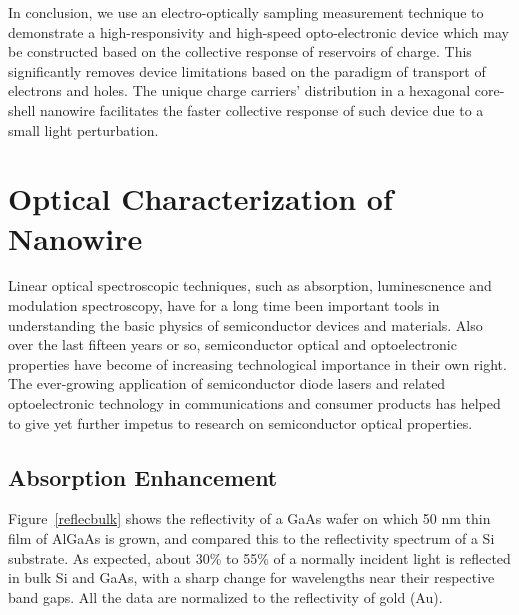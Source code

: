 In conclusion, we use an electro-optically sampling measurement
technique to demonstrate a high-responsivity and high-speed
opto-electronic device which may be constructed based on the collective
response of reservoirs of charge. This significantly removes device
limitations based on the paradigm of transport of electrons and holes.
The unique charge carriers' distribution in a hexagonal core-shell
nanowire facilitates the faster collective response of such device due
to a small light perturbation.

\section{Optical Characterization of Nanowire}

Linear optical spectroscopic
techniques, such as absorption, luminescnence and modulation spectroscopy, have
for a long time been important tools in understanding the basic physics of
semiconductor devices and materials. Also over the last fifteen years or so, semiconductor
optical and optoelectronic properties have become of increasing technological
importance in their own right. The ever-growing application of semiconductor
diode lasers and related optoelectronic technology in communications and
consumer products has helped to give yet further impetus to research on
semiconductor optical properties.

\subsection{Absorption Enhancement} \label{Data_Abs}

Figure~\ref{reflecbulk} shows the reflectivity of a GaAs wafer on which 50 nm
thin film of AlGaAs is grown, and compared this to the reflectivity spectrum of
a Si substrate. As expected, about 30\% to 55\% of a normally incident light is
reflected in bulk Si and GaAs, with a sharp change for wavelengths near their
respective band gaps. All the data are normalized to the reflectivity of gold
(Au).

